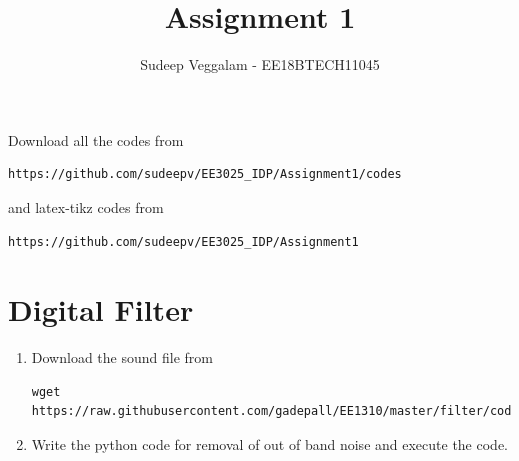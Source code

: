 \documentclass[journal,12pt,twocolumn]{IEEEtran}
\renewcommand\thesection{\arabic{section}}
\begin{document}
     \def\rightbox#1{\makebox[0in][r]{#1}}
     \def\centbox#1{\makebox[0in]{#1}}
     \def\topbox#1{\raisebox{-\baselineskip}[0in][0in]{#1}}
     \def\midbox#1{\raisebox{-0.5\baselineskip}[0in][0in]{#1}}
\vspace{3cm}
\title{Assignment 1}
\author{Sudeep Veggalam - EE18BTECH11045}
\maketitle
\newpage
\renewcommand{\thefigure}{\theenumi}
\renewcommand{\thetable}{\theenumi}
\bigskip
Download all the codes from 
\begin{lstlisting}
https://github.com/sudeepv/EE3025_IDP/Assignment1/codes
\end{lstlisting}
and latex-tikz codes from
\begin{lstlisting}
https://github.com/sudeepv/EE3025_IDP/Assignment1
\end{lstlisting}


\section{Digital Filter}
\begin{enumerate}[label=\thesection.\arabic*
,ref=\thesection.\theenumi]
\item
\label{prob:input}
Download the sound file from  
\begin{lstlisting}
wget https://raw.githubusercontent.com/gadepall/EE1310/master/filter/codes/Sound_Noise.wav
\end{lstlisting}
\item
\label{prob:output}
Write the python code for removal of out of band noise and execute the code.
\\
\solution

\end{enumerate}
\end{document}
